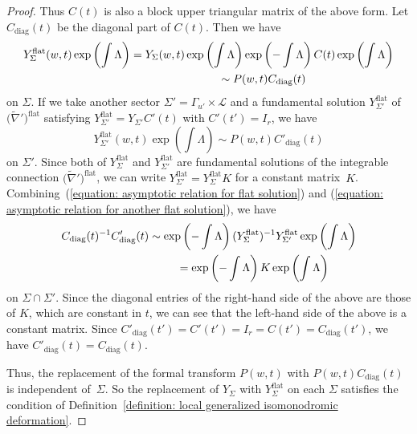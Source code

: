 \documentclass[pdftex]{sigma}
\numberwithin{equation}{section}
\begin{document}
\begin{proof}
Thus $C(t)$ is also a block upper triangular matrix of the above form.
Let $C_{\mathrm{diag}}(t)$ be the diagonal part of $C(t)$.
Then we have
\begin{gather}
 Y^{\mathrm{flat}}_{\Sigma}(w,t) \exp\left( \int\Lambda \right)
 =Y_{\Sigma}(w,t) \exp \left( \int\Lambda \right)
 \exp \left(- \int\Lambda \right) C(t) \exp\left( \int\Lambda \right)\nonumber\\
 \hphantom{Y^{\mathrm{flat}}_{\Sigma}(w,t) \exp\left( \int\Lambda \right)}{}
 \sim P(w,t) C_{\mathrm{diag}}(t)\label{equation: asymptotic relation for flat solution}
\end{gather}
on $\Sigma$.
If we take another sector
$\Sigma'=\Gamma_{u'}\times{\mathcal L}$
and a fundamental solution $Y^{\mathrm{flat}}_{\Sigma'}$ of $\big(\tilde{\nabla}'\big)^{\mathrm{flat}}$
satisfying $Y^{\mathrm{flat}}_{\Sigma'}=Y_{\Sigma'}C'(t)$ with $C'(t')=I_r$,
we have
\begin{equation} \label{equation: asymptotic relation for another flat solution}
 Y^{\mathrm{flat}}_{\Sigma'}(w,t) \exp\left( \int\Lambda \right)
 \sim P(w,t) C'_{\mathrm{diag}}(t)
\end{equation}
on $\Sigma'$.
Since both of $Y^{\mathrm{flat}}_{\Sigma}$ and $Y^{\mathrm{flat}}_{\Sigma'}$
are fundamental solutions of the integrable connection
$\big(\tilde{\nabla}'\big)^{\mathrm{flat}}$,
we can write
$Y^{\mathrm{flat}}_{\Sigma'}=Y^{\mathrm{flat}}_{\Sigma}K$ for a constant matrix~$K$.
Combining~(\ref{equation: asymptotic relation for flat solution}) and
(\ref{equation: asymptotic relation for another flat solution}),
we have
\begin{gather*}
 C_{\mathrm{diag}}(t)^{-1}C'_{\mathrm{diag}}(t)
 \sim
 \exp\left({-} \int\Lambda \right) (Y^{\mathrm{flat}}_{\Sigma})^{-1}
 Y^{\mathrm{flat}}_{\Sigma'} \exp\left( \int\Lambda \right)\\
 \hphantom{C_{\mathrm{diag}}(t)^{-1}C'_{\mathrm{diag}}(t)}{}
 =
 \exp\left({-} \int\Lambda \right) K \exp\left( \int\Lambda \right)
\end{gather*}
on $\Sigma\cap\Sigma'$.
Since the diagonal entries of the right-hand side of the above are those of
$K$, which are constant in $t$,
we can see that the left-hand side of the above is a constant matrix.
Since $C'_{\mathrm{diag}}(t')=C'(t')=I_r=C(t')=C_{\mathrm{diag}}(t')$,
we have $C'_{\mathrm{diag}}(t)=C_{\mathrm{diag}}(t)$.

Thus, the replacement of the formal transform $P(w,t)$ with
$P(w,t)C_{\mathrm{diag}}(t)$ is independent of~$\Sigma$.
So the replacement of $Y_{\Sigma}$ with $Y^{\mathrm{flat}}_{\Sigma}$ on each $\Sigma$
satisfies the condition of
Definition~\ref{definition: local generalized isomonodromic deformation}.
\end{proof}
\end{document}
